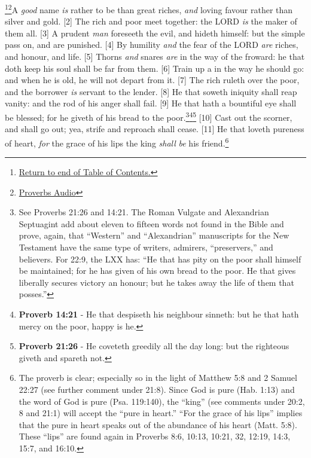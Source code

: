 \footnote{\textcolor[cmyk]{0.99998,1,0,0}{\hyperlink{TOC}{Return to end of Table of Contents.}}}\footnote{\href{https://www.audioverse.org/english/audiobibles/books/ENGKJV/O/Prov/1}{\textcolor[cmyk]{0.99998,1,0,0}{Proverbs Audio}}}\textcolor[cmyk]{0.99998,1,0,0}{A \emph{good} name \emph{is} rather to be  than great riches, \emph{and} loving favour rather than silver and gold.}
[2] \textcolor[cmyk]{0.99998,1,0,0}{The rich and poor meet together: the LORD \emph{is} the maker of them all.}
[3] \textcolor[cmyk]{0.99998,1,0,0}{A prudent \emph{man} foreseeth the evil, and hideth himself: but the simple pass on, and are punished.}
[4] \textcolor[cmyk]{0.99998,1,0,0}{By humility \emph{and} the fear of the LORD \emph{are} riches, and honour, and life.}
[5] \textcolor[cmyk]{0.99998,1,0,0}{Thorns \emph{and} snares \emph{are} in the way of the froward: he that doth keep his soul shall be far from them.}
[6] \textcolor[cmyk]{0.99998,1,0,0}{Train up a  in the way he should go: and when he is old, he will not depart from it.}
[7] \textcolor[cmyk]{0.99998,1,0,0}{The rich ruleth over the poor, and the borrower \emph{is} servant to the lender.}
[8] \textcolor[cmyk]{0.99998,1,0,0}{He that soweth iniquity shall reap vanity: and the rod of his anger shall fail.}
[9] \textcolor[cmyk]{0.99998,1,0,0}{He that hath a bountiful eye shall be blessed; for he giveth of his bread to the poor.}\footnote{See Proverbs 21:26 and 14:21. The Roman Vulgate and Alexandrian Septuagint add about eleven to fifteen words not found in the Bible and prove, again, that “Western” and “Alexandrian” manuscripts for the New Testament have the same type of writers, admirers, “preservers,” and believers. For 22:9, the LXX has: ``He that has pity on the poor shall himself be maintained; for he has given of his own bread to the poor. He that gives liberally secures victory an honour; but he takes away the life of them that posses.''}\footnote{\textbf{Proverb 14:21} - He that despiseth his neighbour sinneth: but he that hath mercy on the poor, happy is he.}\footnote{\textbf{Proverb 21:26} - He coveteth greedily all the day long: but the righteous giveth and spareth not.}
[10] \textcolor[cmyk]{0.99998,1,0,0}{Cast out the scorner, and  shall go out; yea, strife and reproach shall cease.}
[11] \textcolor[cmyk]{0.99998,1,0,0}{He that loveth pureness of heart, \emph{for} the grace of his lips the king \emph{shall} \emph{be} his friend.}\footnote{The proverb is clear; especially so in the light of Matthew 5:8 and 2 Samuel 22:27 (see further comment under 21:8). Since God is pure (Hab. 1:13) and the word of God is pure (Psa. 119:140), the “king” (see comments under 20:2, 8 and 21:1) will accept the “pure in heart.” “For the grace of his lips” implies that the pure in heart speaks out of the abundance of his heart (Matt. 5:8). These “lips” are found again in Proverbs 8:6, 10:13, 10:21, 32, 12:19, 14:3, 15:7, and 16:10.}
